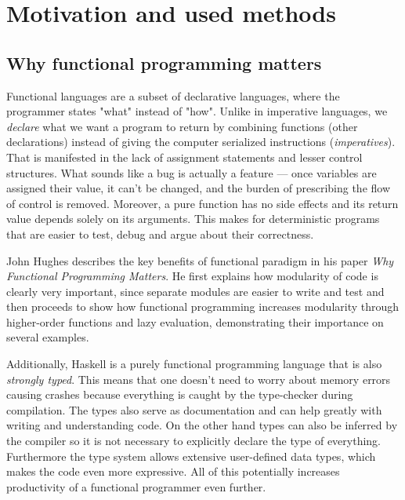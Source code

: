 \documentclass[
  digital, %
  color,   %
  table,   %
  oneside, %
  lof,     %
  lot,     %
]{fithesis3}
\begin{document}
\chapter{Motivation and used methods}


\section{Why functional programming matters}

Functional languages are a subset of declarative languages, where the
programmer states "what" instead of "how". Unlike in imperative languages,
we \emph{declare} what we want a program to return by combining functions (other declarations)
instead of giving the computer serialized instructions (\emph{imperatives}).
That is manifested in the lack of assignment statements and lesser control structures.
What sounds like a bug is actually a feature --- once variables are assigned
their value, it can't be changed, and the burden of prescribing the flow of control
is removed\cite{whyfpmatters}. Moreover, a pure function has no side effects
and its return value depends solely on its arguments. This makes for deterministic
programs that are easier to test, debug and argue about their correctness.

John Hughes describes the key benefits of functional paradigm in his paper
\emph{Why Functional Programming Matters}\cite{whyfpmatters}. He first
explains how modularity of code is clearly very important, since
separate modules are easier to write and test and then proceeds
to show how functional programming increases modularity
through higher-order functions and lazy evaluation, demonstrating
their importance on several examples.

Additionally, Haskell is a purely functional programming language that
is also \emph{strongly typed}. This means that one
doesn't need to worry about memory errors causing crashes because
everything is caught by the type-checker during compilation.
The types also serve as documentation and can help greatly
with writing and understanding code. On the other hand
types can also be inferred by the compiler so it
is not necessary to explicitly declare the type of everything.
Furthermore the type system allows extensive user-defined data types,
which makes the code even more expressive.
All of this potentially increases productivity of a functional programmer even further.
\end{document}
